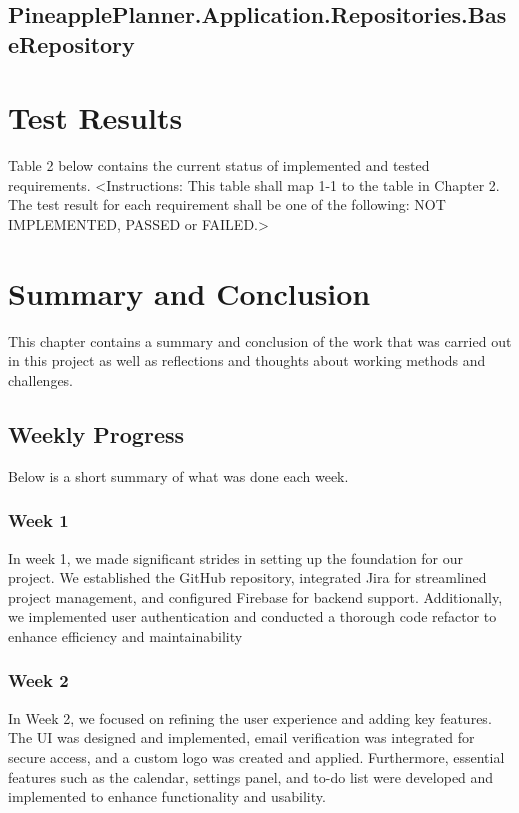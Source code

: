 \documentclass{article}
\begin{document}

\bigbreak

\subsection{PineapplePlanner.Application.Repositories.BaseRepository}


\bigbreak

\section{Test Results}
Table 2 below contains the current status of implemented and tested requirements.
<Instructions: This table shall map 1-1 to the table in Chapter 2. The test result for each requirement shall be one of the following: NOT IMPLEMENTED, PASSED or FAILED.>

\section{Summary and Conclusion}
This chapter contains a summary and conclusion of the work that was carried out in this project as well as reflections and thoughts about working methods and challenges.

\subsection{Weekly Progress}
Below is a short summary of what was done each week.

\subsubsection{Week 1}
In week 1, we made significant strides in setting up the foundation for our project.
We established the GitHub repository, integrated Jira for streamlined project management, and configured Firebase for backend support.
Additionally, we implemented user authentication and conducted a thorough code refactor to enhance efficiency and maintainability

\subsubsection{Week 2}
In Week 2, we focused on refining the user experience and adding key features.
The UI was designed and implemented, email verification was integrated for secure access, and a custom logo was created and applied.
Furthermore, essential features such as the calendar, settings panel, and to-do list were developed and implemented to enhance functionality and usability.
\end{document}
